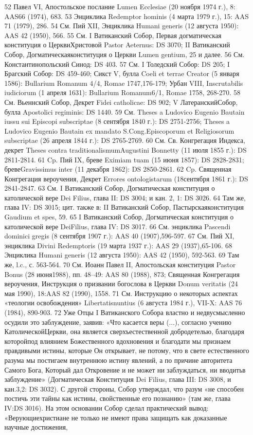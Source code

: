 \documentclass[a5paper,10pt]{article}
\begin{document}
52 Павел VI, Апостольское послание Lumen Ecclesiae (20 ноября 1974 г.), 8: AAS66 (1974), 683.
53 Энциклика Redemptor hominis (4 марта 1979 г.), 15: AAS 71 (1979), 286.
54 См. Пий XII, Энциклика Humani generis (12 августа 1950): AAS 42 (1950), 566.
55 См. I Ватиканский Собор, Первая догматическая конституция о ЦерквиХристовой Pastor Aeternus: DS 3070; II Ватиканский Собор, Догматическаяконституция о Церкви Lumen gentium, 25 и далее.
56 См. Константинопольский Синод: DS 403.
57 См. I Толедский Собор: DS 205; I Брагский Собор: DS 459-460; Сикст V, булла Coeli et terrae Creator (5 января 1586): Bullarium Romanum 4/4, Romae 1747,176-179; Урбан VIII, Inscrutabilis iudiciorum (1 апреля 1631): Bullarium Romanum6/1, Romae 1758, 268-270.
58 См. Вьеннский Собор, Декрет Fidei catholicae: DS 902; V ЛатеранскийСобор, булла Apostolici regiminis: DS 1440.
59 См. Theses a Ludovico Eugenio Bautain iussu sui Episcopi subscriptae (8 сентября 1840 г.): DS 2751-2756; Theses a Ludovico Eugenio Bautain ex mandato S.Cong.Episcoporum et Religiosorum subscriptae (26 апреля 1844 г.): DS 2765-2769.
60 См. Св. Конгрегация Индекса, декрет Theses contra traditionalismumAugustini Bonnetty (11 июля 1855 г.): DS 2811-2814.
61 Cp. Пий IX, бреве Eximiam tuam (15 июня 1857): DS 2828-2831; бревеGravissimus inter (11 декабря 1862): DS 2850-2861.
62 Cp. Священная Конгрегация вероучения, Декрет Errores ontologistarum (18сентября 1861 г.): DS 2841-2847.
63 См. I Ватиканский Собор, Догматическая конституция о католической вере Dei Filius, глава II: DS 3004; и кан. 2, 1: DS 3026.
64 Там же, глава IV: DS 3015; цит. также в: II Ватиканский Собор, Пастырскаяконституция Gaudium et spes, 59.
65 I Ватиканский Собор, Догматическая конституция о католической вере DeiFilius, глава IV: DS 3017.
66 См. энциклика Pascendi dominici gregis (8 сентября 1907 г.): AAS 40 (1907),596-597.
67 См. Пий XI, энциклика Divini Redemptoris (19 марта 1937 г.): AAS 29 (1937),65-106.
68 Энциклика Humani generis (12 августа 1950): AAS 42 (1950), 592-563.
69 Там же, l.c., с. 563-564.
70 См. Иоанн Павел II, Апостольская конституция Pastor Bonus (28 июня1988), пп. 48–49: AAS 80 (1988), 873; Священная Конгрегация вероучения, Инструкция о призвании богослова в Церкви Donum veritatis (24 мая 1990), 18:AAS 82 (1990), 1558.
71 См. Инструкцию о некоторых аспектах «теологии освобождения» Libertatisnuntius (6 августа 1984 г.), VII-X: AAS 76 (1984), 890-903.
72 Уже Отцы I Ватиканского Собора властно и недвусмысленно осудили это заблуждение, заявив: «Что касается веры (...), согласно учению КатолическойЦеркви, она является сверхъестественной добродетелью, благодаря которойпод влиянием Божественного вдохновения и благодати мы признаем правдивыми истины, которые Он открывает, не потому, что в свете естественного разума мы постигаем внутреннюю истину явлений, а по причине авторитета Самого Бога, Который дал Откровение и не может ни заблуждаться, ни вводитьв заблуждение» (Догматическая Конституция Dei Filius, глава III: DS 3008, и кан.3,2: DS 3032). С другой стороны, Собор утверждал, что разум «не способен постичь эти тайны как истины, свойственные его познанию» (там же, глава IV:DS 3016). На этом основании Собор сделал практический вывод: «Верующиехристиане не только не имеют права защищать как доказанные научные достижения,
\end{document}
